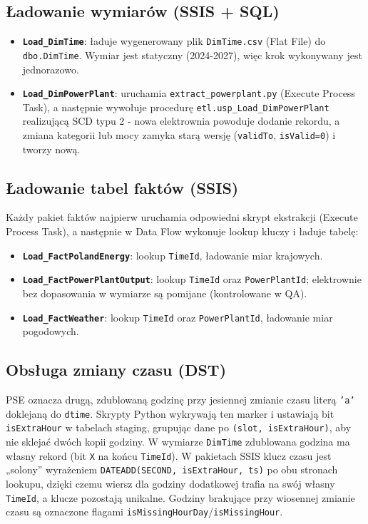 \documentclass[12pt]{article}
\begin{document}
	\subsection{Ładowanie wymiarów (SSIS + SQL)}
	\begin{itemize}
		\item \textbf{\texttt{Load\_DimTime}}: ładuje wygenerowany plik \texttt{DimTime.csv} (Flat File) do \texttt{dbo.DimTime}. Wymiar jest statyczny (2024-2027), więc krok wykonywany jest jednorazowo.
		\item \textbf{\texttt{Load\_DimPowerPlant}}: uruchamia \texttt{extract\_powerplant.py} (Execute Process Task), a następnie wywołuje procedurę \texttt{etl.usp\_Load\_DimPowerPlant} realizującą SCD typu 2 - nowa elektrownia powoduje dodanie rekordu, a zmiana kategorii lub mocy zamyka starą wersję (\texttt{validTo}, \texttt{isValid=0}) i tworzy nową.
	\end{itemize}

	\subsection{Ładowanie tabel faktów (SSIS)}
	Każdy pakiet faktów najpierw uruchamia odpowiedni skrypt ekstrakcji (Execute Process Task), a następnie w Data Flow wykonuje lookup kluczy i ładuje tabelę:
	\begin{itemize}
		\item \textbf{\texttt{Load\_FactPolandEnergy}}: lookup \texttt{TimeId}, ładowanie miar krajowych.
		\item \textbf{\texttt{Load\_FactPowerPlantOutput}}: lookup \texttt{TimeId} oraz \texttt{PowerPlantId}; elektrownie bez dopasowania w wymiarze są pomijane (kontrolowane w QA).
		\item \textbf{\texttt{Load\_FactWeather}}: lookup \texttt{TimeId} oraz \texttt{PowerPlantId}, ładowanie miar pogodowych.
	\end{itemize}

	\subsection{Obsługa zmiany czasu (DST)}
	PSE oznacza drugą, zdublowaną godzinę przy jesiennej zmianie czasu literą \texttt{'a'} doklejaną do \texttt{dtime}. Skrypty Python wykrywają ten marker i ustawiają bit \texttt{isExtraHour} w tabelach staging, grupując dane po \texttt{(slot, isExtraHour)}, aby nie sklejać dwóch kopii godziny. W wymiarze \texttt{DimTime} zdublowana godzina ma własny rekord (bit \texttt{X} na końcu \texttt{TimeId}). W pakietach SSIS klucz czasu jest „solony'' wyrażeniem \texttt{DATEADD(SECOND, isExtraHour, ts)} po obu stronach lookupu, dzięki czemu wiersz dla godziny dodatkowej trafia na swój własny \texttt{TimeId}, a klucze pozostają unikalne. Godziny brakujące przy wiosennej zmianie czasu są oznaczone flagami \texttt{isMissingHourDay}/\texttt{isMissingHour}.
\end{document}
